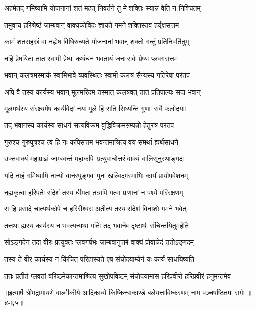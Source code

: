 \twolineshloka
{अहमेतद् गमिष्यामि योजनानां शतं महत्}
{निवर्तने तु मे शक्तिः स्यान्न वेति न निश्चितम्} %

\twolineshloka
{तमुवाच हरिश्रेष्ठं जाम्बवान् वाक्यकोविदः}
{ज्ञायते गमने शक्तिस्तव हर्यृक्षसत्तम} %

\twolineshloka
{कामं शतसहस्रं वा नह्येष विधिरुच्यते}
{योजनानां भवान् शक्तो गन्तुं प्रतिनिवर्तितुम्} %

\twolineshloka
{नहि प्रेषयिता तात स्वामी प्रेष्यः कथंचन}
{भवतायं जनः सर्वः प्रेष्यः प्लवगसत्तम} %

\twolineshloka
{भवान् कलत्रमस्माकं स्वामिभावे व्यवस्थितः}
{स्वामी कलत्रं सैन्यस्य गतिरेषा परंतप} %

\twolineshloka
{अपि वै तस्य कार्यस्य भवान् मूलमरिंदम}
{तस्मात् कलत्रवत् तात प्रतिपाल्यः सदा भवान्} %

\twolineshloka
{मूलमर्थस्य संरक्ष्यमेष कार्यविदां नयः}
{मूले हि सति सिध्यन्ति गुणाः सर्वे फलोदयाः} %

\twolineshloka
{तद् भवानस्य कार्यस्य साधनं सत्यविक्रम}
{वुद्धिविक्रमसम्पन्नो हेतुरत्र परंतप} %

\twolineshloka
{गुरुश्च गुरुपुत्रश्च त्वं हि नः कपिसत्तम}
{भवन्तमाश्रित्य वयं समर्था ह्यर्थसाधने} %

\twolineshloka
{उक्तवाक्यं महाप्राज्ञं जाम्बवन्तं महाकपिः}
{प्रत्युवाचोत्तरं वाक्यं वालिसूनुरथाङ्गदः} %

\twolineshloka
{यदि नाहं गमिष्यामि नान्यो वानरपुङ्गवः}
{पुनः खल्विदमस्माभिः कार्यं प्रायोपवेशनम्} %

\twolineshloka
{नह्यकृत्वा हरिपतेः संदेशं तस्य धीमतः}
{तत्रापि गत्वा प्राणानां न पश्ये परिरक्षणम्} %

\twolineshloka
{स हि प्रसादे चात्यर्थकोपे च हरिरीश्वरः}
{अतीत्य तस्य संदेशं विनाशो गमने भवेत्} %

\twolineshloka
{तत्तथा ह्यस्य कार्यस्य न भवत्यन्यथा गतिः}
{तद् भवानेव दृष्टार्थः संचिन्तयितुमर्हति} %

\twolineshloka
{सोऽङ्गदेन तदा वीरः प्रत्युक्तः प्लवगर्षभः}
{जाम्बवानुत्तमं वाक्यं प्रोवाचेदं ततोऽङ्गदम्} %

\twolineshloka
{तस्य ते वीर कार्यस्य न किंचित् परिहास्यते}
{एष संचोदयाम्येनं यः कार्यं साधयिष्यति} %

\twolineshloka
{ततः प्रतीतं प्लवतां वरिष्ठमेकान्तमाश्रित्य सुखोपविष्टम्}
{संचोदयामास हरिप्रवीरो हरिप्रवीरं हनुमन्तमेव} %


॥इत्यार्षे श्रीमद्रामायणे वाल्मीकीये आदिकाव्ये किष्किन्धाकाण्डे बलेयत्ताविष्करणम् नाम पञ्चषष्ठितमः सर्गः ॥४-६५॥
